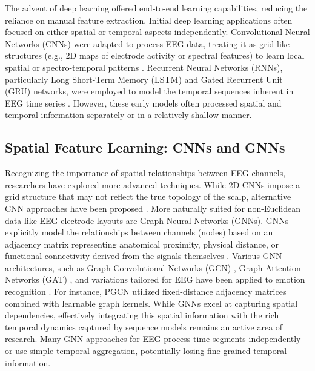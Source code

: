 \documentclass[runningheads]{llncs}
\begin{document}
The advent of deep learning offered end-to-end learning capabilities, reducing the reliance on manual feature extraction. Initial deep learning applications often focused on either spatial or temporal aspects independently. Convolutional Neural Networks (CNNs) were adapted to process EEG data, treating it as grid-like structures (e.g., 2D maps of electrode activity or spectral features) to learn local spatial or spectro-temporal patterns \cite{cite_cnn_eeg_1, cite_cnn_eeg_2}. Recurrent Neural Networks (RNNs), particularly Long Short-Term Memory (LSTM) and Gated Recurrent Unit (GRU) networks, were employed to model the temporal sequences inherent in EEG time series \cite{cite_rnn_lstm_eeg}. However, these early models often processed spatial and temporal information separately or in a relatively shallow manner.

\subsection{Spatial Feature Learning: CNNs and GNNs}
Recognizing the importance of spatial relationships between EEG channels, researchers have explored more advanced techniques. While 2D CNNs impose a grid structure that may not reflect the true topology of the scalp, alternative CNN approaches have been proposed \cite{cite_spherical_cnn_or_other}. More naturally suited for non-Euclidean data like EEG electrode layouts are Graph Neural Networks (GNNs). GNNs explicitly model the relationships between channels (nodes) based on an adjacency matrix representing anatomical proximity, physical distance, or functional connectivity derived from the signals themselves \cite{cite_gnn_review_eeg}. Various GNN architectures, such as Graph Convolutional Networks (GCN) \cite{cite_gcn_kipf}, Graph Attention Networks (GAT) \cite{cite_gat}, and variations tailored for EEG have been applied to emotion recognition \cite{cite_gnn_app_1, cite_gnn_app_2}. For instance, PGCN \cite{cite_jin_pgcn} utilized fixed-distance adjacency matrices combined with learnable graph kernels. While GNNs excel at capturing spatial dependencies, effectively integrating this spatial information with the rich temporal dynamics captured by sequence models remains an active area of research. Many GNN approaches for EEG process time segments independently or use simple temporal aggregation, potentially losing fine-grained temporal information.
\end{document}

